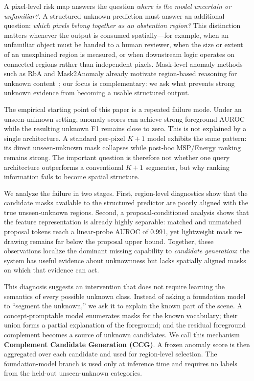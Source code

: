 \documentclass[journal]{IEEEtai}
\newcommand{\CCG}{\textsc{CCG}\xspace}
\begin{document}
A pixel-level risk map answers the question \emph{where is the model uncertain or unfamiliar?}. A structured unknown prediction must answer an additional question: \emph{which pixels belong together as an abstention region?} This distinction matters whenever the output is consumed spatially---for example, when an unfamiliar object must be handed to a human reviewer, when the size or extent of an unexplained region is measured, or when downstream logic operates on connected regions rather than independent pixels. Mask-level anomaly methods such as RbA and Mask2Anomaly already motivate region-based reasoning for unknown content~\cite{nayal2023rba,rai2024mask2anomaly}; our focus is complementary: we ask what prevents strong unknown evidence from becoming a usable structured output.

The empirical starting point of this paper is a repeated failure mode. Under an unseen-unknown setting, anomaly scores can achieve strong foreground AUROC while the resulting unknown F1 remains close to zero. This is not explained by a single architecture. A standard per-pixel $K{+}1$ model exhibits the same pattern: its direct unseen-unknown mask collapses while post-hoc MSP/Energy ranking remains strong. The important question is therefore not whether one query architecture outperforms a conventional $K{+}1$ segmenter, but why ranking information fails to become spatial structure.

We analyze the failure in two stages. First, region-level diagnostics show that the candidate masks available to the structured predictor are poorly aligned with the true unseen-unknown regions. Second, a proposal-conditioned analysis shows that the feature representation is already highly separable: matched and unmatched proposal tokens reach a linear-probe AUROC of 0.991, yet lightweight mask re-drawing remains far below the proposal upper bound. Together, these observations localize the dominant missing capability to \emph{candidate generation}: the system has useful evidence about unknownness but lacks spatially aligned masks on which that evidence can act.

This diagnosis suggests an intervention that does not require learning the semantics of every possible unknown class. Instead of asking a foundation model to ``segment the unknown,'' we ask it to explain the known part of the scene. A concept-promptable model enumerates masks for the known vocabulary; their union forms a partial explanation of the foreground; and the residual foreground complement becomes a source of unknown candidates. We call this mechanism \textbf{Complement Candidate Generation (\CCG)}. A frozen anomaly score is then aggregated over each candidate and used for region-level selection. The foundation-model branch is used only at inference time and requires no labels from the held-out unseen-unknown categories.
\end{document}
